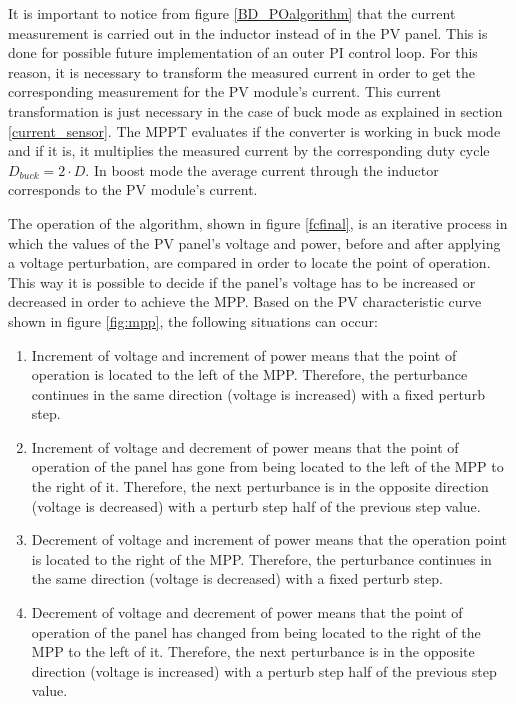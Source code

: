 It is important to notice from figure \ref{BD_POalgorithm} that the current measurement is carried out in the inductor instead of in the PV panel. This is done for possible future implementation of an outer PI control loop. For this reason, it is necessary to transform the measured current in order to get the corresponding measurement for the PV module's current. This current transformation is just necessary in the case of buck mode as explained in section \ref{current_sensor}. The MPPT evaluates if the converter is working in buck mode and if it is, it multiplies the measured current by the corresponding duty cycle $D_{buck}=2\cdot D$. In boost mode the average current through the inductor corresponds to the PV module's current. 


The operation of the algorithm, shown in figure \ref{fcfinal}, is an iterative process in which the values of the PV panel's voltage and power, before and after applying a voltage perturbation, are compared  in order to locate the point of operation. This way it is possible to decide if the panel's voltage has to be increased or decreased in order to achieve the MPP. Based on the PV characteristic curve shown in figure \ref{fig:mpp}, the following situations can occur:

\begin{enumerate}
\item Increment of voltage and increment of power means that the point of operation is located to the left of the MPP. Therefore, the perturbance continues in the same direction (voltage is increased) with a fixed perturb step. 
\item Increment of voltage and decrement of power means that the point of operation of the panel has gone from being located to the left of the MPP to the right of it. Therefore, the next perturbance is in the opposite direction (voltage is decreased) with a perturb step half of the previous step value.
\item Decrement of voltage and increment of power means that the operation point is located to the right of the MPP. Therefore, the perturbance continues in the same direction (voltage is decreased) with a fixed perturb step. 
\item Decrement of voltage and decrement of power means that the point of operation of the panel has changed from being located to the right of the MPP to the left of it. Therefore, the next perturbance is in the opposite direction (voltage is increased) with a perturb step half of the previous step value.
\end{enumerate}

